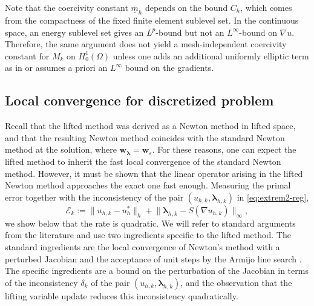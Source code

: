 \documentclass[11pt,pdflatex,sn-mathphys-num]{sn-jnl}
\theoremstyle{thmstyleone}%
\theoremstyle{thmstyletwo}%
\theoremstyle{thmstylethree}%
\newcommand{\bs}[1]{\ensuremath{\boldsymbol{#1}}}
\begin{document}
Note that the coercivity constant $\underline m_h$ depends on the bound $C_h$, which comes from the compactness of the fixed finite element sublevel set. In the continuous space, an energy sublevel set gives an $L^p$-bound but not an $L^\infty$-bound on $\nabla u$. Therefore, the same argument does not yield a mesh-independent coercivity constant for $M_k$ on $H_0^1(\Omega)$ unless one adds an additional uniformly elliptic term as in \cite{schmidt-pStokes-global} or assumes a priori an $L^\infty$ bound on the gradients.

\subsection{Local convergence for discretized problem}
\label{ssec:local-convergence}
Recall that the lifted method was derived as a Newton method in lifted space, and that  
the resulting Newton method coincides with the standard Newton method at the solution, where $\bs w_{\bs\lambda}=\bs w_\varepsilon$. For these reasons, one can expect the lifted method to inherit the fast local convergence of the standard Newton method. However,
it must be shown 
that the linear operator arising in the lifted Newton method approaches the exact one fast enough. Measuring the
primal error together with the inconsistency of the pair
$(u_{h,k},\bs\lambda_{h,k})$ in \eqref{eq:extrem2-reg},
\begin{equation}\label{eq:local-errors}
  \mathcal E_k:=\|u_{h,k}-u_h^*\|_h
  +\bigl\|\bs\lambda_{h,k}-S(\nabla u_{h,k})\bigr\|_{\infty},
\end{equation}
we show below that the rate is quadratic. We will refer to standard arguments from the literature and use two ingredients specific to the lifted method. The standard ingredients are the local convergence of Newton's method with a perturbed Jacobian \cite{Kelley95} and the acceptance of unit steps by the Armijo line search \cite{NocedalWright06}. The specific ingredients are a bound on the perturbation of the Jacobian in terms of the inconsistency $\delta_k$ of the pair $(u_{h,k},\bs\lambda_{h,k})$, and the observation that the lifting variable update reduces this inconsistency quadratically.
\end{document}
